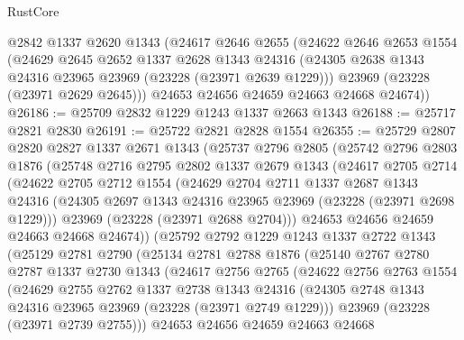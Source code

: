 \begin{lexlean}{RustCore}
\begin{coremodule}
    @2842
    @1337
    @2620
    @1343
    (@24617
      @2646
      @2655
      (@24622
        @2646
        @2653
        @1554
        (@24629
          @2645
          @2652
          @1337
          @2628
          @1343
          @24316
          (@24305 @2638 @1343 @24316 @23965 @23969 (@23228 (@23971 @2639 @1229)))
          @23969
          (@23228 (@23971 @2629 @2645)))
        @24653
        @24656
        @24659
        @24663
        @24668
        @24674))
@26186 := @25709 @2832 @1229 @1243 @1337 @2663 @1343
@26188 := @25717 @2821 @2830
@26191 := @25722 @2821 @2828 @1554
@26355 := @25729
    @2807
    @2820
    @2827
    @1337
    @2671
    @1343
    (@25737
      @2796
      @2805
      (@25742
        @2796
        @2803
        @1876
        (@25748
          @2716
          @2795
          @2802
          @1337
          @2679
          @1343
          (@24617
            @2705
            @2714
            (@24622
              @2705
              @2712
              @1554
              (@24629
                @2704
                @2711
                @1337
                @2687
                @1343
                @24316
                (@24305 @2697 @1343 @24316 @23965 @23969 (@23228 (@23971 @2698 @1229)))
                @23969
                (@23228 (@23971 @2688 @2704)))
              @24653
              @24656
              @24659
              @24663
              @24668
              @24674))
          (@25792
            @2792
            @1229
            @1243
            @1337
            @2722
            @1343
            (@25129
              @2781
              @2790
              (@25134
                @2781
                @2788
                @1876
                (@25140
                  @2767
                  @2780
                  @2787
                  @1337
                  @2730
                  @1343
                  (@24617
                    @2756
                    @2765
                    (@24622
                      @2756
                      @2763
                      @1554
                      (@24629
                        @2755
                        @2762
                        @1337
                        @2738
                        @1343
                        @24316
                        (@24305 @2748 @1343 @24316 @23965 @23969 (@23228 (@23971 @2749 @1229)))
                        @23969
                        (@23228 (@23971 @2739 @2755)))
                      @24653
                      @24656
                      @24659
                      @24663
                      @24668

\end{coremodule}
\end{lexlean}
